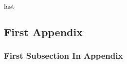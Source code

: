 \appendix
last

\subsection{First Appendix}
\label{FirstAppendix}

\subsubsection{First Subsection In Appendix}
\label{FirstSubsectionAppendix}
